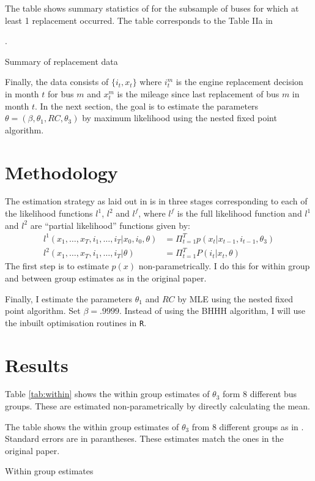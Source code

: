 \documentclass[11pt,letterpaper]{article}
\newcommand{\floatintro}[1]{
  
  \vspace*{0.1in}
  
  {\footnotesize

    #1
    
  }
  
  \vspace*{0.1in} } \newcommand{\Hline}{\noindent\rule{18cm}{0.5pt}}
\begin{document}
\begin{table}
  \floatintro{The table shows summary statistics of for the subsample
    of buses for which at least 1 replacement occurred. The table
    corresponds to the Table IIa in \citep{rust1987optimal}}. 
  \centering
  
  \caption{Summary of replacement data}
  \label{tab:sumstats}
\end{table}

Finally, the data consists of $\{i_t, x_t\}$ where $i_t^m$ is the
engine replacement decision in month $t$ for bus $m$ and $x_t^m$ is
the mileage since last replacement of bus $m$ in month $t$. In the
next section, the goal is to estimate the parameters $\theta = (\beta,
\theta_1, RC, \theta_3)$ by maximum likelihood using the nested fixed
point algorithm. 
\section{Methodology}
The estimation strategy as laid out in \citet{rust1987optimal} is in
three stages corresponding to each of the likelihood functions $l^1$,
$l^2$ and $l^f$, where $l^f$ is the full likelihood function and $l^1$
and $l^2$ are ``partial likelihood'' functions given by:
\begin{align*}
  l^1(x_1, \dots, x_T, i_1, \dots, i_T | x_0, i_0, \theta) &=
  \Pi_{t=1}^T p(x_t|x_{t-1},i_{t-1},\theta_3)\\
  l^2(x_1, \dots, x_T,i_1,\dots,i_T|\theta) &= \Pi_{t=1}^T P(i_t|x_t, \theta)
\end{align*}
The first step is to estimate $p(x)$
non-parametrically. I do this for within group and between group
estimates as in the original paper. 

Finally, I estimate the parameters $\theta_1$ and $RC$ by MLE using
the nested fixed point algorithm. Set $\beta=.9999$. Instead of using
the BHHH algorithm, I will use the inbuilt optimisation routines in
\texttt{R}. 
\section{Results}
Table \ref{tab:within} shows the within group estimates of $\theta_3$
form 8 different bus groups. These are estimated non-parametrically by
directly calculating the mean.

\begin{table}[htbp!]
  \floatintro{The table shows the within group estimates of $\theta_3$
    from 8 different groups as in \citet{rust1987optimal}. Standard
    errors are in parantheses. These estimates match the ones in the
    original paper.}
  \centering
  \resizebox{.9\textwidth}{!}{
    }
  \caption{Within group estimates}
  \label{tab:within}
\end{table}
\end{document}

